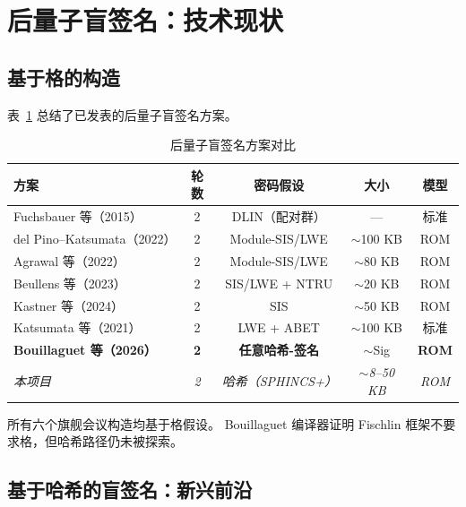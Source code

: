 \documentclass[11pt,a4paper]{ctexart}
\begin{document}
\section{后量子盲签名：技术现状}

\subsection{基于格的构造}

表~\ref{tab:blind} 总结了已发表的后量子盲签名方案。

\begin{table}[h]
\centering
\caption{后量子盲签名方案对比}
\label{tab:blind}
\small
\begin{tabular}{@{}lcccc@{}}
\toprule
\textbf{方案} & \textbf{轮数} & \textbf{密码假设} & \textbf{大小} & \textbf{模型} \\
\midrule
Fuchsbauer 等（2015）\cite{Fuchsbauer2015Practical} & 2 & DLIN（配对群） & --- & 标准 \\
del Pino--Katsumata（2022）\cite{delPino2022Framework} & 2 & Module-SIS/LWE & $\sim$100 KB & ROM \\
Agrawal 等（2022）\cite{Agrawal2022Practical} & 2 & Module-SIS/LWE & $\sim$80 KB & ROM \\
Beullens 等（2023）\cite{Beullens2023LatticeBlind} & 2 & SIS/LWE + NTRU & $\sim$20 KB & ROM \\
Kastner 等（2024）\cite{Kastner2024PairingFree} & 2 & SIS & $\sim$50 KB & ROM \\
Katsumata 等（2021）\cite{Katsumata2021} & 2 & LWE + ABET & $\sim$100 KB & 标准 \\
\midrule
\textbf{Bouillaguet 等（2026）}\cite{Bouillaguet2026BlindingPH} & \textbf{2} & \textbf{任意哈希-签名} & $\sim$Sig & \textbf{ROM} \\
\midrule
\textit{本项目} & \textit{2} & \textit{哈希（SPHINCS+）} & \textit{$\sim$8--50 KB} & \textit{ROM} \\
\bottomrule
\end{tabular}
\end{table}

所有六个旗舰会议构造均基于格假设。
Bouillaguet 编译器证明 Fischlin 框架不要求格，但哈希路径仍未被探索。

\subsection{基于哈希的盲签名：新兴前沿}
\end{document}
